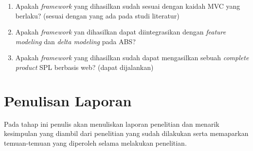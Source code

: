 \begin{enumerate}
    \item Apakah \textit{framework} yang dihasilkan sudah sesuai dengan kaidah MVC yang berlaku? (sesuai dengan yang ada pada studi literatur)
    \item Apakah \textit{framework} yan dihasilkan dapat diintegrasikan dengan \textit{feature modeling} dan \textit{delta modeling} pada ABS?
    \item Apakah \textit{framework} yang dihasilkan sudah dapat mengasilkan sebuah \textit{complete product} SPL berbasis web? (dapat dijalankan)
\end{enumerate}

\section{Penulisan Laporan}

Pada tahap ini penulis akan menuliskan laporan penelitian dan menarik kesimpulan yang diambil dari penelitian yang sudah dilakukan serta memaparkan temuan-temuan yang diperoleh selama melakukan penelitian.